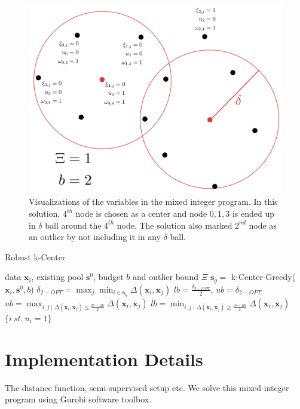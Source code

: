 \documentclass{article}
\begin{document}
\begin{figure}[h]
\includegraphics[width=\columnwidth]{mip.pdf}
    \caption{Visualizations of the variables in the mixed integer program. In this solution, $4^{th}$ node is chosen as a center and node $0,1,3$ is ended up in $\delta$ ball around the $4^{th}$ node. The solution also marked $2^{nd}$ node as an outlier by not including it in any $\delta$ ball.}
\label{mip}
\end{figure}


\begin{algorithm}[tb]
   \caption{Robust k-Center}
   \label{alg:bin}
\begin{algorithmic}
    data $\mathbf{x}_i$, existing pool $\mathbf{s}^0$, budget $b$ and outlier bound $\Xi$
    $\mathbf{s}_g =$ k-Center-Greedy($\mathbf{x}_i, \mathbf{s}^0, b$)
   \STATE $\delta_{2-OPT} = \max_j \min_{i \in \mathbf{s}_g} \Delta(\mathbf{x}_i,\mathbf{x}_j)$ 
   \STATE $lb=\frac{\delta_{2-OPT}}{2}$, $ub=\delta_{2-OPT}$
   \REPEAT
   \STATE $ub=\max_{i,j \mid  \Delta(\mathbf{x}_i,\mathbf{x}_j) \leq \frac{lb+ub}{2}}  \Delta(\mathbf{x}_i,\mathbf{x}_j) $
   \ELSE
   \STATE $lb=\min_{i,j \mid   \Delta(\mathbf{x}_i,\mathbf{x}_j) \geq \frac{lb+ub}{2}}  \Delta(\mathbf{x}_i,\mathbf{x}_j) $
    \ENDIF
       $\{i\ st.\ u_i=1\}$
\end{algorithmic}
\end{algorithm}
\section{Implementation Details}
The distance function, semi-supervised setup etc.
We solve this mixed integer program using Gurobi\cite{gurobi} software toolbox. 
\end{document}
